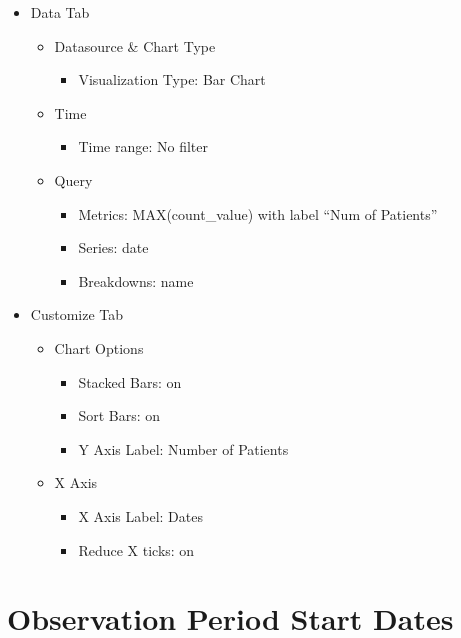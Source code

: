 \documentclass[
]{book}
\providecommand{\tightlist}{%
  \setlength{\itemsep}{0pt}\setlength{\parskip}{0pt}}
\begin{document}
\begin{itemize}
\item
  Data Tab

  \begin{itemize}
  \item
    Datasource \& Chart Type

    \begin{itemize}
    \tightlist
    \item
      Visualization Type: Bar Chart
    \end{itemize}
  \item
    Time

    \begin{itemize}
    \tightlist
    \item
      Time range: No filter
    \end{itemize}
  \item
    Query

    \begin{itemize}
    \item
      Metrics: MAX(count\_value) with label ``Num of Patients''
    \item
      Series: date
    \item
      Breakdowns: name
    \end{itemize}
  \end{itemize}
\item
  Customize Tab

  \begin{itemize}
  \item
    Chart Options

    \begin{itemize}
    \item
      Stacked Bars: on
    \item
      Sort Bars: on
    \item
      Y Axis Label: Number of Patients
    \end{itemize}
  \item
    X Axis

    \begin{itemize}
    \item
      X Axis Label: Dates
    \item
      Reduce X ticks: on
    \end{itemize}
  \end{itemize}
\end{itemize}

\hypertarget{observation-period-start-dates}{%
\section{Observation Period Start Dates}\label{observation-period-start-dates}}
\end{document}

